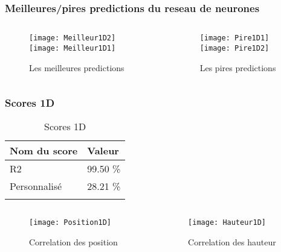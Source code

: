 \begin{frame}[fragile]
    \frametitle{Meilleures/pires predictions du reseau de neurones}

    \begin{columns}
    \begin{column}{0.5\textwidth}
        \begin{figure}
        \texttt{[image: Meilleur1D2]}       
        \texttt{[image: Meilleur1D1]}       
        \caption{Les meilleures predictions}
        \end{figure}
     \end{column}
     \begin{column}{0.5\textwidth}
        \begin{figure}
        \texttt{[image: Pire1D1]}       
        \texttt{[image: Pire1D2]}       
        \caption{Les pires predictions}
        \end{figure}
     \end{column}
    \end{columns}

\end{frame}

\begin{frame}
    \frametitle{Scores 1D}

    \begin{table}[h!]
        \caption{Scores 1D}
        \centering
        \begin{tabular}{l l}
        \toprule
        \textbf{Nom du score} & \textbf{Valeur} \\
        \midrule
        R2 & 99.50 \%\\
        Personnalisé & 28.21 \%\\
        \bottomrule\\
        \end{tabular}
    \end{table}

    \begin{columns}
        \begin{column}{0.5\textwidth}
            \begin{figure}
            \texttt{[image: Position1D]}       
            \caption{Correlation des position}
            \end{figure}
         \end{column}
         \begin{column}{0.5\textwidth}
            \begin{figure}
            \texttt{[image: Hauteur1D]}       
            \caption{Correlation des hauteur}
            \end{figure}
         \end{column}
    \end{columns}

\end{frame}


